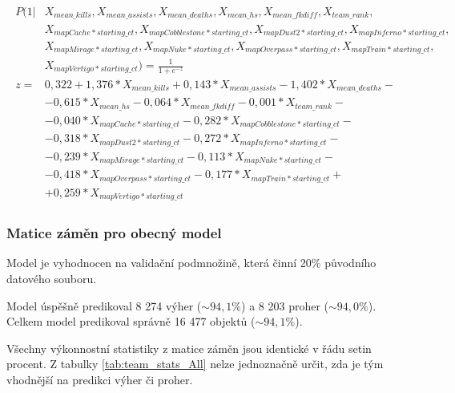 \begin{align}
    \begin{split}
        P(1 | &X_{mean\_kills}, X_{mean\_assists}, X_{mean\_deaths}, X_{mean\_hs}, X_{mean\_fkdiff}, X_{team\_rank}, \\
              &X_{mapCache*starting\_ct}, X_{mapCobblestone*starting\_ct}, X_{mapDust2*starting\_ct}, X_{mapInferno*starting\_ct}, \\
              &X_{mapMirage*starting\_ct}, X_{mapNuke*starting\_ct}, X_{mapOverpass*starting\_ct}, X_{mapTrain*starting\_ct}, \\
              &X_{mapVertigo*starting\_ct}) = \frac{1}{1 + e^{-z}} \\
        z = &0,322 + 1,376*X_{mean\_kills} + 0,143*X_{mean\_assists} - 1,402*X_{mean\_deaths} - \\
            &- 0,615*X_{mean\_hs} - 0,064*X_{mean\_fkdiff} - 0,001*X_{team\_rank} - \\
            &- 0,040*X_{mapCache*starting\_ct} - 0,282*X_{mapCobblestone*starting\_ct} - \\
            &- 0,318*X_{mapDust2*starting\_ct} - 0,272*X_{mapInferno*starting\_ct} - \\
            &- 0,239*X_{mapMirage*starting\_ct} - 0,113*X_{mapNuke*starting\_ct} - \\
            &- 0,418*X_{mapOverpass*starting\_ct} - 0,177*X_{mapTrain*starting\_ct} + \\
            &+ 0,259*X_{mapVertigo*starting\_ct}
    \end{split}
\end{align}

\subsubsection{Matice záměn pro obecný model}
Model je vyhodnocen na validační podmnožině, která činní 20\% původního datového souboru.



Model úspěšně predikoval 8 274 výher ($\sim 94,1\%$) a 8 203 proher ($\sim 94,0\%$). Celkem model predikoval správně 16 477 objektů ($\sim 94,1\%$).



Všechny výkonnostní statistiky z matice záměn jsou identické v řádu setin procent. Z tabulky \ref{tab:team_stats_All} nelze jednoznačně určit, zda je tým
vhodnější na predikci výher či proher.

